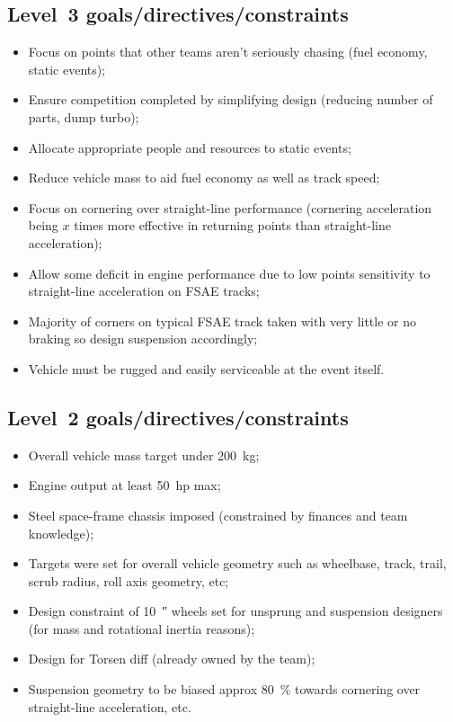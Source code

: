 \documentclass[10pt, a4paper, article, oneside, twocolumn, final]{memoir}
\begin{document}
\subsection*{Level~3 goals/\allowbreak directives/\allowbreak constraints}
\begin{itemize}
    \item Focus on points that other teams aren’t seriously chasing (fuel economy, static events); 
    \item Ensure competition completed by simplifying design (reducing number of parts, dump turbo); 
    \item Allocate appropriate people and resources to static events; 
    \item Reduce vehicle mass to aid fuel economy as well as track speed; 
    \item Focus on cornering over straight-line performance (cornering acceleration being $x$ times more effective in returning points than straight-line acceleration); 
    \item Allow some deficit in engine performance due to low points sensitivity to straight-line acceleration on FSAE tracks; 
    \item Majority of corners on typical FSAE track taken with very little or no braking so design suspension accordingly; 
    \item Vehicle must be rugged and easily serviceable at the event itself.
\end{itemize}

\subsection*{Level~2 goals/\allowbreak directives/\allowbreak constraints}
\begin{itemize}
    \item Overall vehicle mass target under \SI{200}{\kilogram};
    \item Engine output at least \SI{50}{hp} max;
    \item Steel space-frame chassis imposed (constrained by finances and team knowledge); 
    \item Targets were set for overall vehicle geometry such as wheelbase, track, trail, scrub radius, roll axis geometry, etc; 
    \item Design constraint of \SI{10}{\arcsecond} wheels set for unsprung and suspension designers (for mass and rotational inertia reasons); 
    \item Design for Torsen diff (already owned by the team); 
    \item Suspension geometry to be biased approx \SI{80}{\percent} towards cornering over straight-line acceleration, etc.     
\end{itemize}
\end{document}
